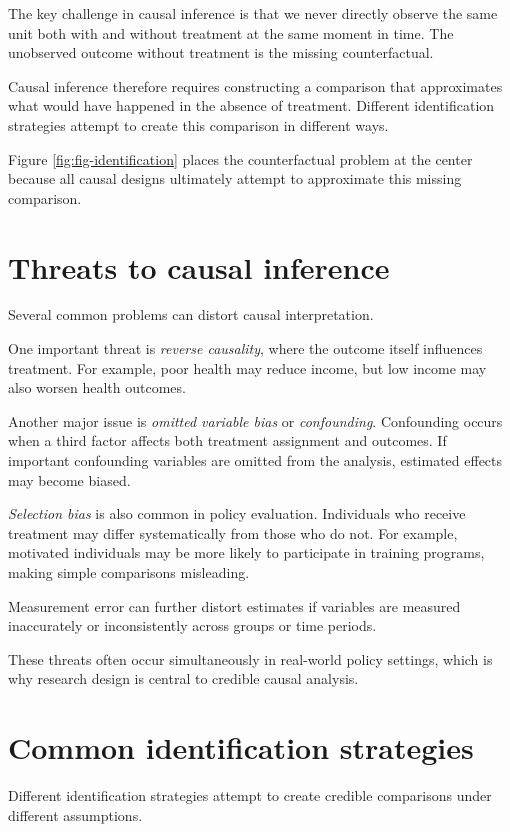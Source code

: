 \documentclass[
  11pt,
  oneside]{book}
\begin{document}
The key challenge in causal inference is that we never directly observe the same unit both with and without treatment at the same moment in time. The unobserved outcome without treatment is the missing counterfactual.

Causal inference therefore requires constructing a comparison that approximates what would have happened in the absence of treatment. Different identification strategies attempt to create this comparison in different ways.

Figure \ref{fig:fig-identification} places the counterfactual problem at the center because all causal designs ultimately attempt to approximate this missing comparison.

\section{Threats to causal inference}\label{threats-to-causal-inference}

Several common problems can distort causal interpretation.

One important threat is \emph{reverse causality}, where the outcome itself influences treatment. For example, poor health may reduce income, but low income may also worsen health outcomes.

Another major issue is \emph{omitted variable bias} or \emph{confounding}. Confounding occurs when a third factor affects both treatment assignment and outcomes. If important confounding variables are omitted from the analysis, estimated effects may become biased.

\emph{Selection bias} is also common in policy evaluation. Individuals who receive treatment may differ systematically from those who do not. For example, motivated individuals may be more likely to participate in training programs, making simple comparisons misleading.

Measurement error can further distort estimates if variables are measured inaccurately or inconsistently across groups or time periods.

These threats often occur simultaneously in real-world policy settings, which is why research design is central to credible causal analysis.

\section{Common identification strategies}\label{common-identification-strategies}

Different identification strategies attempt to create credible comparisons under different assumptions.
\end{document}
